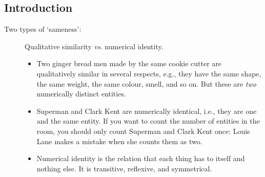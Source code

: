\documentclass[oneside]{article}
\begin{document}
\thispagestyle{fancy}


\subsection*{Introduction}
\begin{description}
\item [Two types of `sameness':] Qualitative similarity \emph{vs.} numerical identity. 
\begin{itemize} 
\item Two ginger bread men made by the same cookie cutter are qualitatively similar in several respects, e.g., they have the same shape, the same weight, the same colour, smell, and so on. But these are \emph{two} numerically distinct entities. 
\item Superman and Clark Kent are numerically identical, i.e., they are one and the same entity. If you want to count the number of entities in the room, you should only count Superman and Clark Kent once: Louis Lane makes a mistake when she counts them as two. 
\item Numerical identity is the relation that each thing has to itself and nothing else. It is transitive, reflexive, and symmetrical.
\end{itemize}
\end{description}
\end{document}
